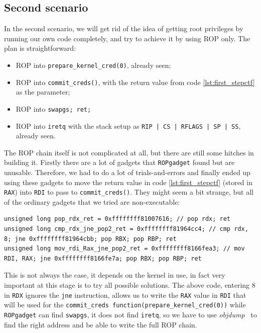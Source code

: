 \documentclass{masterthesis}
\begin{document}
\subsection{Second scenario}
\label{subsect:second scenario}
In the second scenario, we will get rid of the idea of getting root privileges by running our own code completely, and try to achieve it by using ROP only. The plan is straightforward:
\begin{itemize} 
\item ROP into \texttt{prepare\_kernel\_cred(0)}, already seen;
\item ROP into \texttt{commit\_creds()}, with the return value from code \ref{lst:first_stepctf} as the parameter;
\item ROP into \texttt{swapgs; ret;}
\item ROP into \texttt{iretq} with the stack setup as \texttt{RIP | CS | RFLAGS | SP | SS}, already seen.
\end{itemize}
The ROP chain itself is not complicated at all, but there are still some hitches in building it. Firstly there are a lot of gadgets that \texttt{ROPgadget} found but are unusable. Therefore, we had to do a lot of trials-and-errors and finally ended up using these gadgets to move the return value in code \ref{lst:first_stepctf} (stored in \texttt{RAX}) into \texttt{RDI} to pass to \texttt{commit\_creds()}. They might seem a bit strange, but all of the ordinary gadgets that we tried are non-executable:
\begin{lstlisting}
unsigned long pop_rdx_ret = 0xffffffff81007616; // pop rdx; ret
unsigned long cmp_rdx_jne_pop2_ret = 0xffffffff81964cc4; // cmp rdx, 8; jne 0xffffffff81964cbb; pop RBX; pop RBP; ret
unsigned long mov_rdi_Rax_jne_pop2_ret = 0xffffffff8166fea3; // mov RDI, RAX; jne 0xffffffff8166fe7a; pop RBX; pop RBP; ret
\end{lstlisting}
This is not always the case, it depends on the kernel in use, in fact very important at this stage is to try all possible solutions.
The above code, entering 8 in \texttt{RDX} ignores the \texttt{jne} instruction, allows us to write the \texttt{RAX} value in \texttt{RDI} that will be used for the \texttt{commit\_creds function(prepare\_kernel\_cred(0))}
while \texttt{ROPgadget} can find \texttt{swapgs}, it does not find \texttt{iretq}, so we have to use \emph{objdump}~\cite{weatherspoonassemblers} to find the right address and be able to write the full ROP chain.
\end{document}
